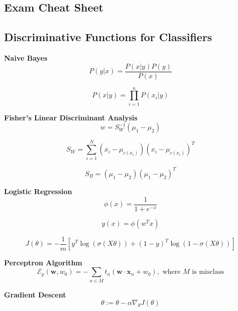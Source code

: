 \documentclass[8pt]{article}
\begin{document}
\begin{multicols}{2}
\section*{Exam Cheat Sheet}

\subsection*{Discriminative Functions for Classifiers}
\textbf{Naive Bayes}
\begin{equation}
    P(y|x) = \frac{P(x|y)P(y)}{P(x)}
\end{equation}

\begin{equation}
    P(x|y) = \prod_{i=1}^{n} P(x_i|y)
\end{equation}

\textbf{Fisher's Linear Discriminant Analysis}
\begin{equation}
    w = S_W^{-1} (\mu_1 - \mu_2)
\end{equation}

\begin{equation}
    S_W = \sum_{i=1}^{N} (x_i - \mu_{c(x_i)})(x_i - \mu_{c(x_i)})^T
\end{equation}

\begin{equation}
    S_B = (\mu_1 - \mu_2)(\mu_1 - \mu_2)^T
\end{equation}

\textbf{Logistic Regression}
\begin{equation}
    \phi(x) = \frac{1}{1 + e^{-x}}
\end{equation}

\begin{equation}
    y(x) = \phi(w^T x)
\end{equation}

\begin{equation}
    J(\theta) = -\frac{1}{m} [y^T\log(\sigma(X\theta)) + (1-y)^T\log(1-\sigma(X\theta))]
\end{equation}

\textbf{Perceptron Algorithm}
\begin{equation}
    \mathcal{E}_p (\mathbf{w}, w_0) = -\sum_{n \in M} t_n(\mathbf{w} \cdot \mathbf{x}_n + w_0), \text{ where } M \text{ is misclass} 
\end{equation}

\textbf{Gradient Descent}
\begin{equation}
    \theta := \theta - \alpha \nabla_{\theta} J(\theta)
\end{equation}


\end{multicols}
\end{document}
